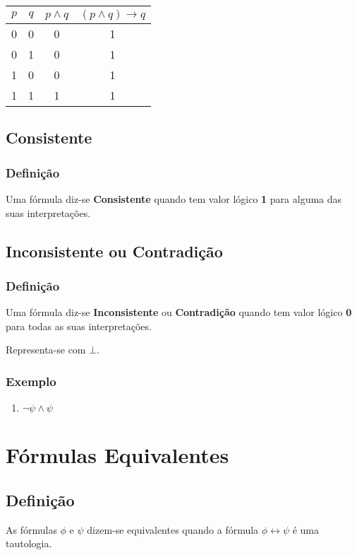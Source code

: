 \begin{table}[H]
    \begin{tabular}{|c|c|c|c|}
        \hline
        $p$ & $q$ & $p \land q$ & $(p \land q) \rightarrow q$ \\
        \hline
        0 & 0 & 0 & 1 \\
        0 & 1 & 0 & 1 \\
        1 & 0 & 0 & 1 \\
        1 & 1 & 1 & 1 \\
        \hline
    \end{tabular}
\end{table}

\subsection{Consistente}
\subsubsection{Definição}
Uma fórmula diz-se \textbf{Consistente} quando tem valor lógico \textbf{1} para alguma das suas interpretações.

\subsection{Inconsistente ou Contradição}
\subsubsection{Definição}
Uma fórmula diz-se \textbf{Inconsistente} ou \textbf{Contradição} quando tem valor lógico \textbf{0} para todas as suas interpretações.

Representa-se com $\bot$.

\subsubsection{Exemplo}
\begin{enumerate}
    \item $\neg \psi \land \psi$
\end{enumerate}

\section{Fórmulas Equivalentes}
\subsection{Definição}
As fórmulas $\phi$ e $\psi$ dizem-se equivalentes quando a fórmula $\phi \leftrightarrow \psi$ é uma tautologia.

